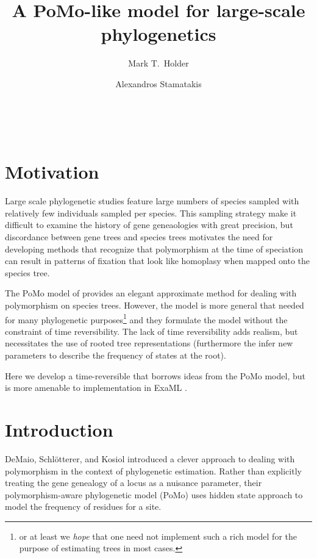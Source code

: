 \documentclass{llncs}
\newcommand{\pomo}{PoMo\xspace}
\begin{document}
\title{A \pomo-like model for large-scale phylogenetics}
\author{Mark T.~Holder\and Alexandros Stamatakis}
\\
\newcommand\enum{\addtocounter{equation}{1}\tag{\theequation}}
\maketitle              %
\section {Motivation}
Large scale phylogenetic studies feature large numbers of species sampled with relatively few
    individuals sampled per species.
This sampling strategy make it difficult to examine the history of gene geneaologies with great precision, but 
    discordance between gene trees and species trees motivates the need for developing methods
    that recognize that polymorphism at the time of speciation can result in patterns of fixation
    that look like homoplasy when mapped onto the species tree.

The \pomo model of \cite{DeMaioSK2013} provides an elegant approximate method for dealing with polymorphism 
    on species trees.
However, the model is more general that needed for many phylogenetic purposes\footnote{or at least we {\em hope} that
    one need not implement such a rich model for the purpose of estimating trees in most cases.} and
    they formulate the model without the constraint of time reversibility.
The lack of time reversibility adds realism, but necessitates the use of rooted tree representations (furthermore
    the infer new parameters to describe the frequency of states at the root).

Here we develop a time-reversible that borrows ideas from the \pomo model, but is more amenable to 
    implementation in ExaML \cite{ExaMLInitial,ExaMLLatest}.
\section {Introduction}
DeMaio, Schl\"otterer, and Kosiol \cite{DeMaioSK2013} introduced a clever approach to dealing with polymorphism in the context of
    phylogenetic estimation.
Rather than explicitly treating the gene genealogy of a locus as a nuisance parameter, their polymorphism-aware
    phylogenetic model (\pomo) uses hidden state approach to model the frequency of residues for a site.
\end{document}
